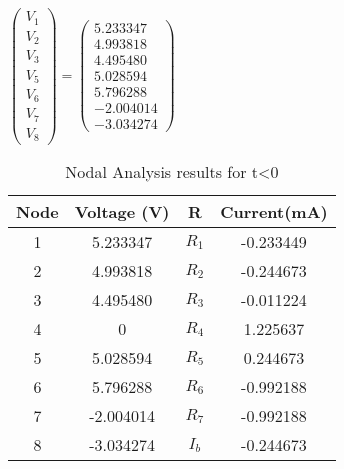 $ \left(\begin{array}{c} V_1 \\ V_2 \\ V_3 \\ V_5 \\ V_6 \\ V_7 \\ V_8 \end{array}\right)= \left(\begin{array}{c} 5.233347 \\ 4.993818 \\ 4.495480 \\ 5.028594 \\ 5.796288 \\ -2.004014 \\ -3.034274 \end{array}\right) $
 \begin{table}[H]
 \footnotesize
 \centering
 \caption{Nodal Analysis results for t<0}
 \label{tab:tables}
 \begin{center}
 \begin{tabular}{cccc}
\hline 
 Node & Voltage (V) & R & Current(mA) \\ 
 \hline 
 1 & 5.233347& $R_1$ & -0.233449 \\ 
 \hline 
 2& 4.993818 & $R_2$ & -0.244673\\ 
 \hline 
 3 & 4.495480& $R_3$ & -0.011224 \\ 
 \hline 
 4 & 0 &$R_4$ & 1.225637 \\ 
 \hline 
 5 &5.028594& $R_5$ & 0.244673\\ 
 \hline 
 6 & 5.796288 & $R_6$ & -0.992188\\ 
 \hline 
 7 & -2.004014 & $R_7$ & -0.992188\\ 
 \hline 
 8 & -3.034274 & $I_b$ & -0.244673 \\ 
 \hline \end{tabular} 
 \end{center} 
 \end{table}